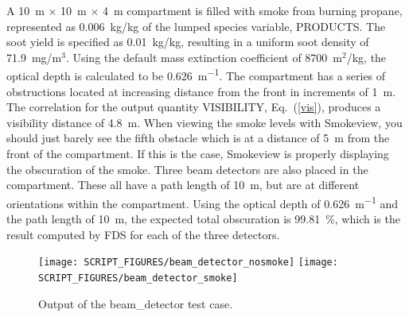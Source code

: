 \documentclass[11pt]{book}
\begin{document}
A 10~m $\times$ 10~m $\times$ 4~m compartment is filled with smoke from burning propane, represented as 0.006~kg/kg of the lumped species variable, {\ct PRODUCTS}. The soot yield is specified as 0.01~kg/kg, resulting in a uniform soot density of 71.9~mg/m$^3$. Using the default mass extinction coefficient of 8700~m$^2$/kg, the optical depth is calculated to be 0.626~\si{m^{-1}}.  The compartment has a series of obstructions located at increasing distance from the front in increments of 1~m.  The correlation for the output quantity {\ct VISIBILITY}, Eq.~(\ref{vis}), produces a visibility distance of 4.8~m. When viewing the smoke levels with Smokeview, you should just barely see the fifth obstacle which is at a distance of 5~m from the front of the compartment. If this is the case, Smokeview is properly displaying the obscuration of the smoke.  Three beam detectors are also placed in the compartment.  These all have a path length of 10~m, but are at different orientations within the compartment. Using the optical depth of 0.626~\si{m^{-1}} and the path length of 10~m, the expected total obscuration is 99.81~\%, which is the result computed by FDS for each of the three detectors.

\begin{figure}[ht]
\begin{center}
\texttt{[image: SCRIPT\_FIGURES/beam\_detector\_nosmoke]}
\texttt{[image: SCRIPT\_FIGURES/beam\_detector\_smoke]}
\end{center}
\caption[Results of the {\ct beam\_detector} test case]{Output of the {\ct beam\_detector} test case.}
\label{beam_detector}
\end{figure}
\end{document}

